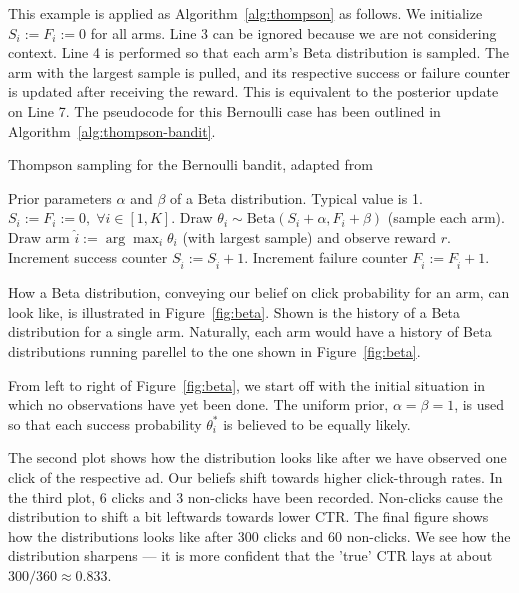 \documentclass{article} %
\begin{document}
This example is applied as Algorithm~\ref{alg:thompson} as follows. We
initialize $S_i := F_i := 0$ for all arms. Line 3 can be ignored because we are
not considering context. Line 4 is performed so that each arm's Beta
distribution is sampled.  The arm with the largest sample is pulled, and its
respective success or failure counter is updated after receiving the reward.
This is equivalent to the posterior update on Line 7.  The pseudocode for this
Bernoulli case has been outlined in Algorithm~\ref{alg:thompson-bandit}.

\begin{algorithm}[H]
  \caption{Thompson sampling for the Bernoulli bandit, adapted from \cite{chapelle2011empirical}}
  \label{alg:thompson-bandit}
  \begin{algorithmic}[1]
    \Require Prior parameters $\alpha$ and $\beta$ of a Beta distribution.
    Typical value is 1.
    \State $S_i := F_i := 0, \; \forall i \in [1,K]$.
      \State Draw $\theta_i \sim \text{Beta}(S_i + \alpha, F_i + \beta)$
      (sample each arm).
      \EndFor
      \State Draw arm $\hat{i} := \arg\max_{i} \theta_i$ (with largest sample) and observe reward $r$.
      \State Increment success counter $S_{\hat{i}} := S_{\hat{i}} + 1$.
      \Else
        \State Increment failure counter $F_{\hat{i}} := F_{\hat{i}} + 1$.
      \EndIf
    \EndFor
  \end{algorithmic}
\end{algorithm}

How a Beta distribution, conveying our belief on click probability for an arm,
can look like, is illustrated in Figure~\ref{fig:beta}. Shown is the history of
a Beta distribution for a single arm. Naturally, each arm would have a history
of Beta distributions running parellel to the one shown in
Figure~\ref{fig:beta}.

From left to right of Figure~\ref{fig:beta}, we start off with the initial
situation in which no observations have yet been done. The uniform prior,
$\alpha = \beta = 1$, is used so that each success probability $\theta^*_i$ is
believed to be equally likely.

The second plot shows how the distribution looks like after we have observed
one click of the respective ad. Our beliefs shift towards higher click-through
rates. In the third plot, 6 clicks and 3 non-clicks have been recorded.
Non-clicks cause the distribution to shift a bit leftwards towards lower CTR.
The final figure shows how the distributions looks like after 300 clicks and 60
non-clicks. We see how the distribution sharpens --- it is more confident that
the 'true' CTR lays at about $300 / 360 \approx 0.833$.
\end{document}
